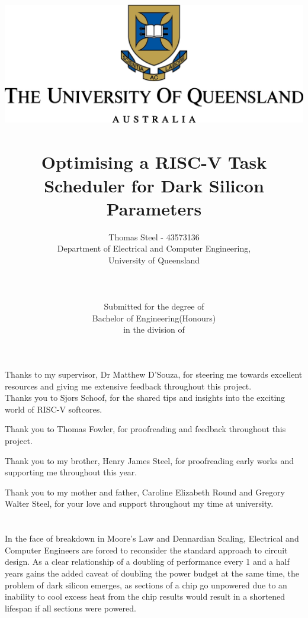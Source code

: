 \documentclass[a4paper,12pt]{report}
\author{Thomas Steel - 43573136\\
	Department of Electrical and Computer Engineering,\\University of Queensland\\
	\\
	\\
	\\
	Submitted for the degree of\\
	Bachelor of Engineering(Honours)\\
	in the division of
}
\title{
	\includegraphics[width=\textwidth]{PNGlogo.png}~\\[1cm]
	Optimising a RISC-V Task Scheduler for Dark Silicon Parameters
}
\begin{document}
	
	\maketitle
	\leavevmode\thispagestyle{empty}\newpage
	
	\thispagestyle{empty}
	
	
	
	\leavevmode\thispagestyle{empty}\newpage
	
	\section*{}
	\begin{center}
		Thanks to my supervisor, Dr Matthew D'Souza, for steering me towards excellent resources and giving me extensive feedback throughout this project. \\
	
		\noindent Thanks you to Sjors Schoof, for the shared tips and insights into the exciting world of RISC-V softcores.
		
		\noindent Thank you to Thomas Fowler, for proofreading and feedback throughout this project.
		
		\noindent Thank you to my brother, Henry James Steel, for proofreading early works and supporting me throughout this year.
		
		\noindent Thank you to my mother and father, Caroline Elizabeth Round and Gregory Walter Steel, for your love and support throughout my time at university.
	\end{center} 
	\leavevmode\thispagestyle{empty}\newpage
	\leavevmode\thispagestyle{empty}\newpage
	\section*{}
	In the face of breakdown in Moore's Law and Dennardian Scaling, Electrical and Computer Engineers are forced to reconsider the standard approach to circuit design. As a clear relationship of a doubling of performance every 1 and a half years gains the added caveat of doubling the power budget at the same time, the problem of dark silicon emerges, as sections of a chip go unpowered due to an inability to cool excess heat from the chip results would result in a shortened lifespan if all sections were powered.
	
\end{document}
